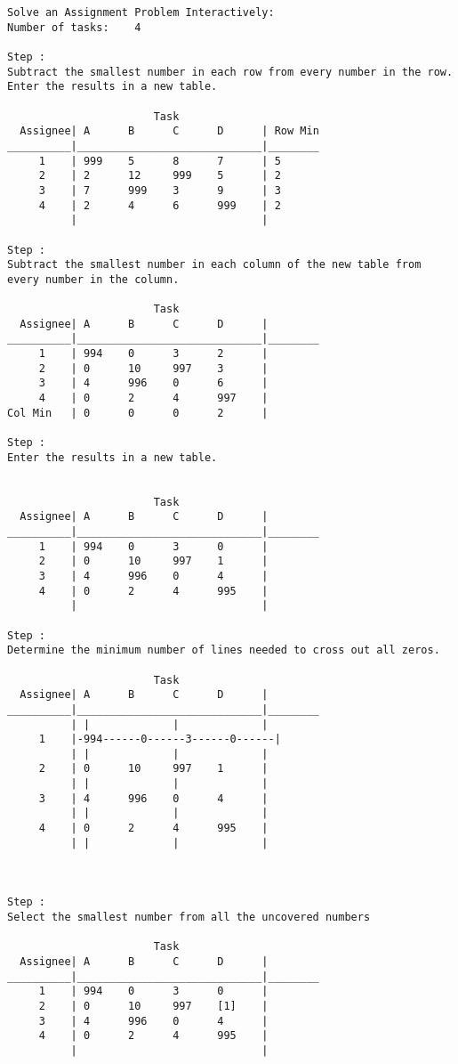 \documentclass[titlepage, letterpaper]{article}
\begin{document}
\begin{lstlisting}[basicstyle=\tiny]
Solve an Assignment Problem Interactively:
Number of tasks:    4

Step :
Subtract the smallest number in each row from every number in the row.
Enter the results in a new table.

                       Task
  Assignee| A      B      C      D      | Row Min
__________|_____________________________|________
     1    | 999    5      8      7      | 5
     2    | 2      12     999    5      | 2
     3    | 7      999    3      9      | 3
     4    | 2      4      6      999    | 2
          |                             | 

Step :
Subtract the smallest number in each column of the new table from every number in the column.

                       Task
  Assignee| A      B      C      D      |
__________|_____________________________|________
     1    | 994    0      3      2      | 
     2    | 0      10     997    3      | 
     3    | 4      996    0      6      | 
     4    | 0      2      4      997    | 
Col Min   | 0      0      0      2      | 

Step :
Enter the results in a new table.


                       Task
  Assignee| A      B      C      D      |
__________|_____________________________|________
     1    | 994    0      3      0      | 
     2    | 0      10     997    1      | 
     3    | 4      996    0      4      | 
     4    | 0      2      4      995    | 
          |                             | 

Step :
Determine the minimum number of lines needed to cross out all zeros.

                       Task
  Assignee| A      B      C      D      |
__________|_____________________________|________
          | |             |             |
     1    |-994------0------3------0------|
          | |             |             |
     2    | 0      10     997    1      |
          | |             |             |
     3    | 4      996    0      4      |
          | |             |             |
     4    | 0      2      4      995    |
          | |             |             |



Step :
Select the smallest number from all the uncovered numbers

                       Task
  Assignee| A      B      C      D      |
__________|_____________________________|________
     1    | 994    0      3      0      | 
     2    | 0      10     997    [1]    | 
     3    | 4      996    0      4      | 
     4    | 0      2      4      995    | 
          |                             | 


\end{lstlisting}
\end{document}
